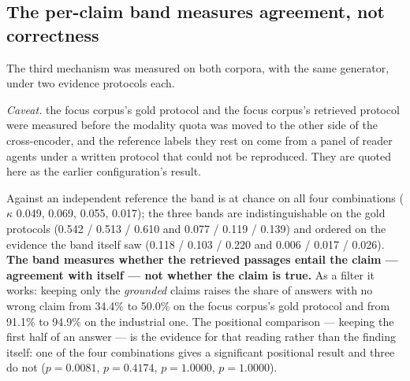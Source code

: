 \documentclass[conference]{IEEEtran}
\begin{document}
\subsection{The per-claim band measures agreement, not correctness}

The third mechanism was measured on both corpora, with the same generator,
under two evidence protocols each.

\begin{table}[t]
\centering
\caption{The per-claim confidence band against an independent reference, on both corpora and both evidence protocols. The kappa column is the agreement between the band and the reference on the binary question \emph{is this claim supported}. The band-error column gives the error rate of the \emph{grounded}, \emph{inferred} and \emph{uncertain} bands in that order. The last column is the share of answers containing no wrong claim, before and after keeping only the \emph{grounded} claims.}
\label{tab:ind-band}
\small
{}
\end{table}


\emph{Caveat.} the focus corpus's gold protocol and the focus corpus's retrieved protocol were measured before the modality quota was moved to the other side of the cross-encoder, and the reference labels they rest on come from a panel of reader agents under a written protocol that could not be reproduced. They are quoted here as the earlier configuration's result.

Against an independent reference the band is at chance on all four
combinations ($\kappa$ 0.049, 0.069, 0.055,
0.017); the three bands are indistinguishable on the gold
protocols (0.542 / 0.513 / 0.610 and
0.077 / 0.119 / 0.139) and ordered on
the evidence the band itself saw (0.118 / 0.103 /
0.220 and 0.006 / 0.017 /
0.026). \textbf{The band measures whether the retrieved
passages entail the claim --- agreement with itself --- not whether the claim
is true.} As a filter it works: keeping only the \emph{grounded} claims
raises the share of answers with no wrong claim from
34.4\% to
50.0\%
on the focus corpus's gold protocol and from
91.1\% to
94.9\%
on the industrial one. The positional comparison --- keeping the first half
of an answer --- is the evidence for that reading rather than the finding
itself: one of the four combinations gives a significant positional result
and three do not ($p=0.0081$, $p=0.4174$, $p=1.0000$,
$p=1.0000$).
\end{document}
